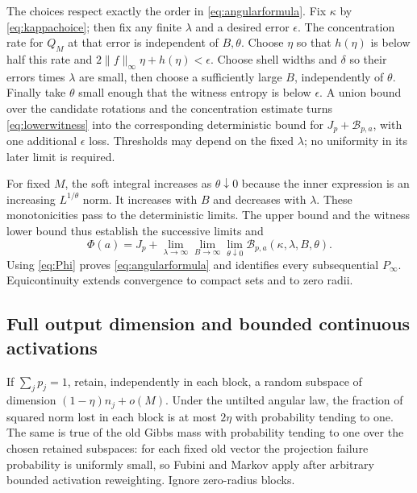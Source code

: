 \documentclass[11pt]{article}
\numberwithin{equation}{section}
\theoremstyle{definition}
\newcommand{\norm}[1]{\lVert #1\rVert}
\begin{document}
The choices respect exactly the order in \eqref{eq:angularformula}. Fix $\kappa$ by \eqref{eq:kappachoice}; then fix any finite $\lambda$ and a desired error $\epsilon$. The concentration rate for $Q_M$ at that error is independent of $B,\theta$. Choose $\eta$ so that $h(\eta)$ is below half this rate and $2\norm f_\infty\eta+h(\eta)<\epsilon$. Choose shell widths and $\delta$ so their errors times $\lambda$ are small, then choose a sufficiently large $B$, independently of $\theta$. Finally take $\theta$ small enough that the witness entropy is below $\epsilon$. A union bound over the candidate rotations and the concentration estimate turns \eqref{eq:lowerwitness} into the corresponding deterministic bound for $J_p+\mathcal B_{p,a}$, with one additional $\epsilon$ loss. Thresholds may depend on the fixed $\lambda$; no uniformity in its later limit is required.

For fixed $M$, the soft integral increases as $\theta\downarrow0$ because the inner expression is an increasing $L^{1/\theta}$ norm. It increases with $B$ and decreases with $\lambda$. These monotonicities pass to the deterministic limits. The upper bound and the witness lower bound thus establish the successive limits and
\[
\Phi(a)=J_p+
\lim_{\lambda\to\infty}\lim_{B\to\infty}\lim_{\theta\downarrow0}
\mathcal B_{p,a}(\kappa,\lambda,B,\theta).
\]
Using \eqref{eq:Phi} proves \eqref{eq:angularformula} and identifies every subsequential $P_\infty$. Equicontinuity extends convergence to compact sets and to zero radii.

\subsection{Full output dimension and bounded continuous activations}
If $\sum_jp_j=1$, retain, independently in each block, a random subspace of dimension $(1-\eta)n_j+o(M)$. Under the untilted angular law, the fraction of squared norm lost in each block is at most $2\eta$ with probability tending to one. The same is true of the old Gibbs mass with probability tending to one over the chosen retained subspaces: for each fixed old vector the projection failure probability is uniformly small, so Fubini and Markov apply after arbitrary bounded activation reweighting. Ignore zero-radius blocks.
\end{document}
